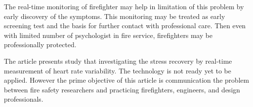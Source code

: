 \documentclass[smallcondensed]{svjour3}
\begin{document}
The real-time monitoring of firefighter may help in limitation of this problem by early discovery of the symptoms. This monitoring may be treated as early screening test and the basis for further contact with professional care. Then even with limited number of psychologist in fire service, firefighters may be professionally protected.

The article presents study that investigating the stress recovery by real-time measurement of heart rate variability. The technology is not ready yet to be applied. However the prime objective of this article is communication the problem between fire safety researchers and practicing firefighters, engineers, and design professionals.



\end{document}
